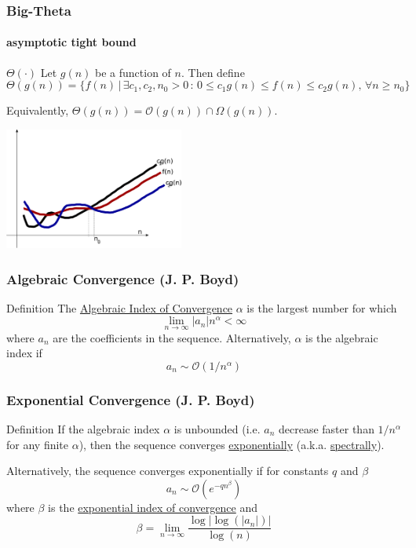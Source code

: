 \documentclass[10pt]{beamer}
\newcommand{\mO}{{\mathcal{O}}}
\begin{document}
\begin{frame}
\frametitle{Big-Theta}
\framesubtitle{asymptotic tight bound}
\begin{block}{$\Theta(\cdot)$}
Let $g(n)$ be a function of $n$.  Then define
\begin{equation*}
  \Theta(g(n)) = \{f(n)\,|\, \exists c_1,c_2,n_0>0 \,:\, 0\leq c_1g(n) \leq
f(n)\leq c_2 g(n),\, \forall
n\geq n_0\}
\end{equation*}

Equivalently, $\Theta(g(n)) = \mO(g(n)) \cap \Omega(g(n))$.
\end{block}

\begin{center}
  \includegraphics[height=4cm]{./figs/bigo_3}
\end{center}
\end{frame}
\begin{frame}
\frametitle{Algebraic Convergence (J. P. Boyd)}
\begin{block}{Definition}
The {\underline {Algebraic Index of Convergence}} $\alpha$ is the largest number for which
\[
	\lim_{n\rightarrow\infty} |a_{n}| n^{\alpha} < \infty
	\]
	where $a_{n}$ are the coefficients in the sequence.  Alternatively, $\alpha$ is the algebraic index if
	\[
	a_{n} \sim \mO(1/n^{\alpha})
	\]
\end{block}
\end{frame}
\begin{frame}
\frametitle{Exponential Convergence (J. P. Boyd)}
\begin{block}{Definition}
If the algebraic index $\alpha$ is unbounded (i.e. $a_{n}$ decrease faster than
$1/n^{\alpha}$ for any finite $\alpha$), then the sequence converges {\underline{exponentially}} (a.k.a. {\underline{spectrally}}).
\bigskip

Alternatively, the sequence converges exponentially if for constants $q$ and $\beta$
	\[
	a_{n} \sim \mO(e^{-q n^{\beta}})
	\]
	where $\beta$ is the {\underline{exponential index of convergence}} and
	\[
	\beta = \lim_{n\rightarrow\infty}\frac{\log | \log(|a_{n}|) |}{\log(n)}
	\]
\end{block}
\end{frame}
\end{document}
